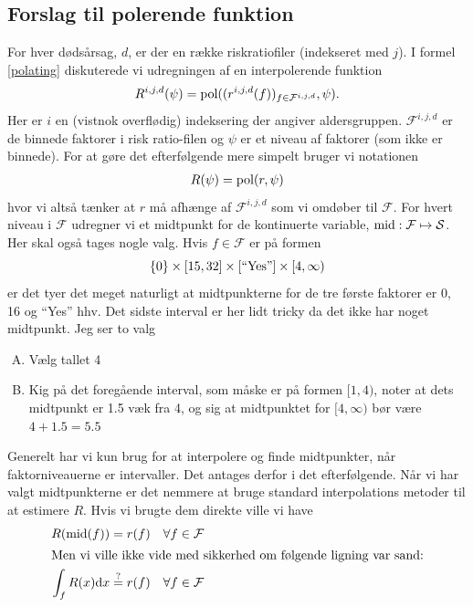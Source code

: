 \documentclass[a4paper, 12pt]{memoir}
\begin{document}
\subsection{Forslag til polerende funktion}
For hver dødsårsag, $d$, er der en række riskratiofiler (indekseret med $j$). I formel \eqref{polating} diskuterede vi udregningen af en interpolerende funktion
\begin{equation*}
R^{i,j,d}(\psi)=\textup{pol}((r^{i,j,d}(f))_{f\in \mathcal F^{i,j,d}}, \psi).
\end{equation*}
Her er $i$ en (vistnok overflødig) indeksering der angiver aldersgruppen. $\mathcal F^{i,j,d}$ er de binnede faktorer i risk ratio-filen og $\psi$ er et niveau af faktorer (som ikke er binnede). For at gøre det efterfølgende mere simpelt bruger vi notationen
\begin{align*}
R(\psi)=\textup{pol}(r,\psi)
\end{align*}
hvor vi altså tænker at $r$ må afhænge af $\mathcal F^{i,j,d}$ som vi omdøber til $\mathcal F$. For hvert niveau i $\mathcal F$ udregner vi et midtpunkt for de kontinuerte variable, $\textup{mid}: \mathcal F \mapsto \mathcal S$. Her skal også tages nogle valg. Hvis $f\in \mathcal F$ er på formen
\begin{equation*}
\{0\}\times [15,32] \times [\textup{``Yes''}] \times [4, \infty)
\end{equation*}
er det tyer det meget naturligt at midtpunkterne for de tre første faktorer er 0, 16 og ``Yes'' hhv. Det sidste interval er her lidt tricky da det ikke har noget midtpunkt. Jeg ser to valg
\begin{enumerate}[(A)]
\item
Vælg tallet 4
\item
Kig på det foregående interval, som måske er på formen $[1,4)$, noter at dets midtpunkt er 1.5 væk fra 4, og sig at midtpunktet for $[4,\infty)$ bør være $4+1.5=5.5$
\end{enumerate}
Generelt har vi kun brug for at interpolere og finde midtpunkter, når faktorniveauerne er intervaller. Det antages derfor i det efterfølgende. Når vi har valgt midtpunkterne er det nemmere at bruge standard interpolations metoder til at estimere \( R\).  Hvis vi brugte dem direkte ville vi have
\begin{align}
R(\textup{mid}(f))&=r(f) \quad\forall f\in \mathcal F\label{midpoint_equality}\\
\intertext{Men vi ville ikke vide med sikkerhed om følgende ligning var sand:}
\int_fR(x) \textup{d}x &\stackrel{?}{=} r(f) \quad \forall f \in \mathcal F\label{integral_equality}
\end{align}
\end{document}
